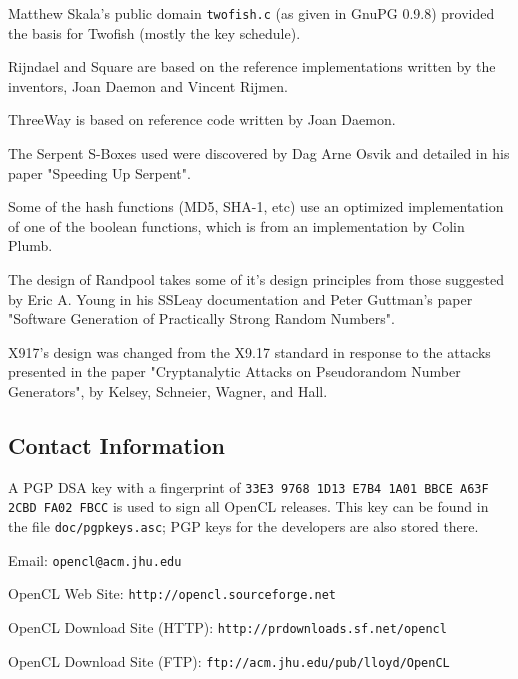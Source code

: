 \documentclass{article}
\newcommand{\filename}[1]{\texttt{#1}}
\begin{document}
\noindent
Matthew Skala's public domain \filename{twofish.c} (as given in GnuPG 0.9.8)
provided the basis for Twofish (mostly the key schedule).

\noindent
Rijndael and Square are based on the reference implementations written by the
inventors, Joan Daemon and Vincent Rijmen.

\noindent
ThreeWay is based on reference code written by Joan Daemon.

\noindent
The Serpent S-Boxes used were discovered by Dag Arne Osvik and detailed in his
paper "Speeding Up Serpent".

\noindent
Some of the hash functions (MD5, SHA-1, etc) use an optimized implementation
of one of the boolean functions, which is from an implementation by
Colin Plumb.

\noindent
The design of Randpool takes some of it's design principles from those
suggested by Eric A. Young in his SSLeay documentation and Peter Guttman's
paper "Software Generation of Practically Strong Random Numbers".

\noindent
X917's design was changed from the X9.17 standard in response to the attacks
presented in the paper "Cryptanalytic Attacks on Pseudorandom Number
Generators", by Kelsey, Schneier, Wagner, and Hall.

\setlength{\parskip}{0pt}

\pagebreak

\subsection{Contact Information}

A PGP DSA key with a fingerprint of
\verb|33E3 9768 1D13 E7B4 1A01 BBCE A63F 2CBD FA02 FBCC| is used to sign all
OpenCL releases. This key can be found in the file \filename{doc/pgpkeys.asc};
PGP keys for the developers are also stored there.

\vskip 5pt \noindent
Email: \verb|opencl@acm.jhu.edu|

\vskip 5pt \noindent
OpenCL Web Site: \verb|http://opencl.sourceforge.net|

\vskip 5pt \noindent
OpenCL Download Site (HTTP): \verb|http://prdownloads.sf.net/opencl|

\vskip 5pt \noindent
OpenCL Download Site (FTP): \verb|ftp://acm.jhu.edu/pub/lloyd/OpenCL|
\end{document}
